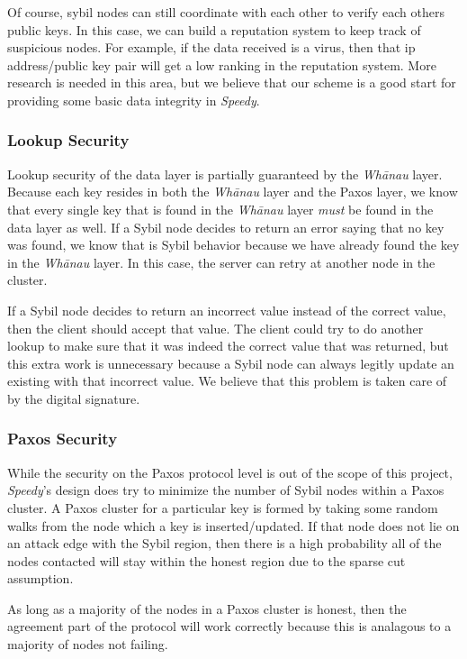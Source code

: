 \documentclass[letter]{article}
\newcommand{\sys}{\textit{Speedy}}
\newcommand{\whanau}{\textit{Wh\={a}nau}}
\begin{document}
Of course, sybil nodes can still coordinate with each other to verify each others public keys. In this case, we can build a reputation system to keep track of suspicious nodes. For example, if the data received is a virus, then that ip address/public key pair will get a low ranking in the reputation system. More research is needed in this area, but we believe that our scheme is a good start for providing some basic data integrity in \sys.

\subsubsection{Lookup Security}

Lookup security of the data layer is partially guaranteed by the \whanau{} layer. Because each key resides
in both the \whanau{} layer and the Paxos layer, we know that every single key that is found in the \whanau{}
layer \emph{must} be found in the data layer as well. If a Sybil node decides to return an error saying that
no key was found, we know that is Sybil behavior because we have already found the key in the \whanau{} layer.
In this case, the server can retry at another node in the cluster.

If a Sybil node decides to return an incorrect value instead of the correct value, then the client should accept 
that value. The client could try to do another lookup to make sure that it was indeed the correct value that was returned,
but this extra work is unnecessary because a Sybil node can always legitly update an existing with that incorrect
value. We believe that this problem is taken care of by the digital signature.


\subsubsection{Paxos Security}
While the security on the Paxos protocol level is out of the scope of this project, \sys's
design does try to minimize the number of Sybil nodes within a Paxos cluster.
A Paxos cluster for a particular key is formed by taking some random walks from the node which a key is inserted/updated.
If that node does not lie on an attack edge with the Sybil region, then there is a high probability
all of the nodes contacted will stay within the honest region due to the sparse cut assumption.

As long as a majority of the nodes in a Paxos cluster is honest, then the agreement part of the protocol
will work correctly because this is analagous to a majority of nodes not failing.
\end{document}

